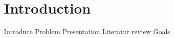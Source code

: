 \chapter{Introduction}
\label{sec:introduction}
Introduce
Problem Presentation
Literatur review
Goals
\citep{brescianini_design_2016}
\citep{nikou_mechanical_2015}
\citep{kamel_voliro:_2018}
\citep{tognon_omnidirectional_2018}
\citep{rajappa_modeling_2015}
\citep{rashad_design_2017}
\citep{park_design_2016}
\citep{ryll_modeling_2012}
\citep{burri_maximum_2016}
